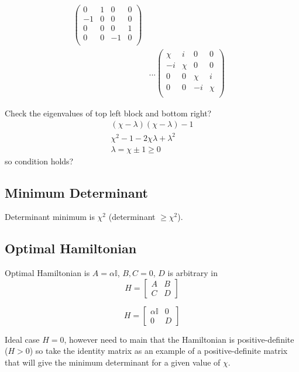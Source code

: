 \documentclass[11pt,a4paper]{article}
\numberwithin{equation}{section}
\begin{document}
\begin{align*}
\begin{pmatrix}
	0 & 1 & 0 & 0 \\
	-1 & 0 & 0 & 0\\
	0 & 0 & 0 & 1\\
	0 & 0 & -1 & 0\\
	\end{pmatrix}&\\
	&...\begin{pmatrix}
	\chi & i & 0 & 0 \\
	-i & \chi & 0 & 0\\
	0 & 0 & \chi & i\\
	0 & 0 & -i & \chi\\
	\end{pmatrix}&
	\end{align*}	

	Check the eigenvalues of top left block and bottom right?  
	\begin{align*}
	&(\chi- \lambda)(\chi- \lambda) - 1&\\
	&\chi^2 - 1 - 2\chi \lambda + \lambda^2&\\
	&\lambda = \chi \pm 1 \geq 0& \tag*{as $\chi \geq 1$}
	\end{align*} so condition holds?
	
	
	\subsection{Minimum Determinant}
	Determinant minimum is $\chi^{2}$ (determinant $\geq \chi^{2}$).
		
	\subsection{Optimal Hamiltonian}
	Optimal Hamiltonian is $A = \alpha \mathbb{I}$, $B, C = 0$, $D$ is arbitrary in
	\begin{equation*}
	H =
	\left[
	\begin{array}{c|c}
	A & B \\
	\hline
	C & D
	\end{array}
	\right]
	\end{equation*}
		
	\begin{equation}\label{eq:43}
	H =
	\left[
	\begin{array}{c|c}
	\alpha \mathbb{I} & 0 \\
	\hline
	0 & D
	\end{array}
	\right]
	\end{equation}
	
	Ideal case $H=0$, however need to main that the Hamiltonian is positive-definite ($H>0$) so take the identity matrix as an example of a positive-definite matrix that will give the minimum determinant for a given value of $\chi$. 
\end{document}
